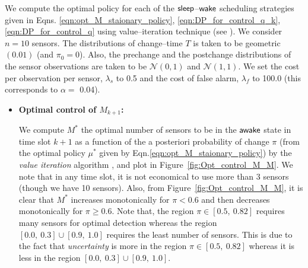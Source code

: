 \documentclass[journal]{IEEEtran}
\newcommand{\sleep}{{${\sf sleep }$}}
\newcommand{\wake}{{${\sf awake }$}}
\begin{document}
We compute the optimal policy for each of the \sleep--${\sf wake}$
scheduling strategies given in Eqns. \ref{eqn:opt_M_staionary_policy},
\ref{eqn:DP_for_control_q_k}, \ref{eqn:DP_for_control_q} using
value--iteration technique (see \cite{books.bertsekas00a}). We consider
$n = 10$ sensors. The distributions of change--time $T$ is taken to be
geometric $(0.01)$ (and $\pi_0 = 0$). Also, the prechange and the
postchange distributions of the sensor observations are taken to be
$\mathcal{N}(0,1)$ and $\mathcal{N}(1,1)$. We set the cost per
observation per sensor, $\lambda_s$ to 0.5 and the cost of false alarm,
$\lambda_f$ to 100.0 (this corresponds to $\alpha =$ 0.04). 


\begin{itemize}
\item {\bf Optimal control of $M_{k+1}$:}

We compute $M^*$ the optimal number of sensors to be in the
{\wake} state in time slot $k+1$ as a function of the a posteriori
probability of change $\pi$ (from the optimal policy $\mu^*$ given
by Eqn.\ref{eqn:opt_M_staionary_policy}) by the {\em value iteration}
algorithm 
\cite{books.bertsekas07b}, \cite{lerma} and plot in
Figure~\ref{fig:Opt_control_M_M}. We note that in any time slot, it is
not economical to use more than 3 sensors (though we have 10 sensors).
Also, from Figure~\ref{fig:Opt_control_M_M}, it is clear that $M^*$
increases monotonically for $\pi < 0.6$ and then decreases monotonically
for $\pi \ge 0.6$. Note that, the region $\pi \in [0.5, \ 0.82]$ 
requires many sensors for optimal detection whereas the region $[0.0, \
0.3]\cup[0.9, \ 1.0]$ requires the least number of sensors.  This is due
to the fact that {\em uncertainty} is more in the region $\pi \in [0.5,
\  0.82]$ whereas it is less in the region $[0.0, \ 0.3]\cup[0.9, \
1.0]$. 
   
\vspace{2mm}


\end{itemize}
\end{document}
